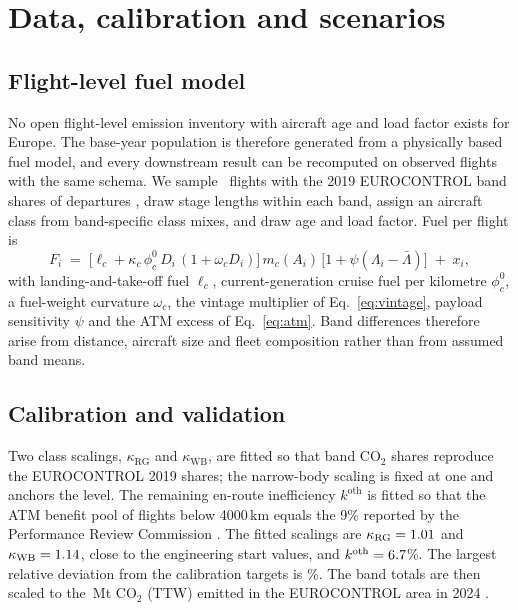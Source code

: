 \documentclass[preprint, 12pt, authoryear]{elsarticle}
\begin{document}
\section{Data, calibration and scenarios}
\label{sec:data}

\subsection{Flight-level fuel model}
\label{sec:flightmodel}

No open flight-level emission inventory with aircraft age and load factor exists
for Europe. The base-year population is therefore generated from a physically
based fuel model, and every downstream result can be recomputed on observed
flights with the same schema. We sample \NFlights\ flights with the 2019
EUROCONTROL band shares of departures \citep{eurocontrol2021, prc2021}, draw
stage lengths within each band, assign an aircraft class from band-specific
class mixes, and draw age and load factor. Fuel per flight is
\begin{equation}
\label{eq:flightfuel}
F_i \;=\; \bigl[\ell_{c} + \kappa_c\,\phi^{0}_{c}\,D_i\,(1+\omega_c D_i)\bigr]\,
m_{c}(A_i)\,\bigl[1+\psi(\Lambda_i-\bar\Lambda)\bigr] \;+\; x_i,
\end{equation}
with landing-and-take-off fuel $\ell_c$, current-generation cruise fuel per
kilometre $\phi^0_c$, a fuel-weight curvature $\omega_c$, the vintage multiplier
of Eq.~\eqref{eq:vintage}, payload sensitivity $\psi$ and the ATM excess of
Eq.~\eqref{eq:atm}. Band differences therefore arise from distance, aircraft
size and fleet composition rather than from assumed band means.

\subsection{Calibration and validation}

Two class scalings, $\kappa_{\mathrm{RG}}$ and $\kappa_{\mathrm{WB}}$, are fitted
so that band CO$_2$ shares reproduce the EUROCONTROL 2019 shares; the
narrow-body scaling is fixed at one and anchors the level. The remaining
en-route inefficiency $k^{\mathrm{oth}}$ is fitted so that the ATM benefit pool
of flights below 4000\,km equals the 9\% reported by the Performance Review
Commission \citep{prr2024}. The fitted scalings are $\kappa_{\mathrm{RG}}=1.01$
and $\kappa_{\mathrm{WB}}=1.14$, close to the engineering start values, and
$k^{\mathrm{oth}}=6.7$\%. The largest relative deviation from the
calibration targets is \CalMaxResid\%. The band totals are then scaled to the
\CoTwoBase\,Mt CO$_2$ (TTW) emitted in the EUROCONTROL area in 2024
\citep{prr2024}.
\end{document}
